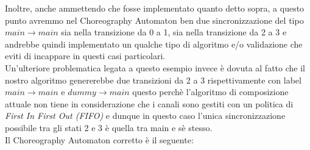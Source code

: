Inoltre, anche ammettendo che fosse implementato quanto detto sopra, a questo punto avremmo nel Choreography Automaton ben due sincronizzazione del tipo $main \rightarrow main$ sia nella transizione da 0 a 1, sia nella transizione da 2 a 3 e andrebbe quindi implementato un qualche tipo di algoritmo e/o validazione che eviti di incappare in questi casi particolari.\\
Un'ulteriore problematica legata a questo esempio invece è dovuta al fatto che il nostro algoritmo genererebbe due transizioni da 2 a 3 rispettivamente con label $main \rightarrow main$ e $dummy \rightarrow main$ questo perchè l'algoritmo di composizione attuale non tiene in considerazione che i canali sono gestiti con un politica di \emph{First In First Out (FIFO)} e dunque in questo caso l'unica sincronizzazione possibile tra gli stati 2 e 3 è quella tra main e sè stesso.\bigskip \\
Il Choreography Automaton corretto è il seguente:
\begin{figure}[h!]
    \centering
\end{figure}